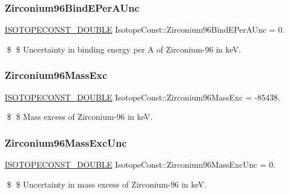 \subsubsection{\texorpdfstring{Zirconium96\+Bind\+E\+Per\+A\+Unc}{Zirconium96BindEPerAUnc}}
{\footnotesize\ttfamily \mbox{\hyperlink{group___isotope_const-_macros_ga8f45a7272ce02c0b4c65c44636ed719a}{I\+S\+O\+T\+O\+P\+E\+C\+O\+N\+S\+T\+\_\+\+D\+O\+U\+B\+LE}} Isotope\+Const\+::\+Zirconium96\+Bind\+E\+Per\+A\+Unc = 0.}

\$ \$ Uncertainty in binding energy per A of Zirconium-\/96 in keV. \mbox{\label{group___isotope_const-_zirconium-_zr96_gaeda1fe6901f94737fd801858b0702889}} 
\subsubsection{\texorpdfstring{Zirconium96\+Mass\+Exc}{Zirconium96MassExc}}
{\footnotesize\ttfamily \mbox{\hyperlink{group___isotope_const-_macros_ga8f45a7272ce02c0b4c65c44636ed719a}{I\+S\+O\+T\+O\+P\+E\+C\+O\+N\+S\+T\+\_\+\+D\+O\+U\+B\+LE}} Isotope\+Const\+::\+Zirconium96\+Mass\+Exc = -\/85438.}

\$ \$ Mass excess of Zirconium-\/96 in keV. \mbox{\label{group___isotope_const-_zirconium-_zr96_gafcbe89c7aab5ccb4ee3b8863868841be}} 
\subsubsection{\texorpdfstring{Zirconium96\+Mass\+Exc\+Unc}{Zirconium96MassExcUnc}}
{\footnotesize\ttfamily \mbox{\hyperlink{group___isotope_const-_macros_ga8f45a7272ce02c0b4c65c44636ed719a}{I\+S\+O\+T\+O\+P\+E\+C\+O\+N\+S\+T\+\_\+\+D\+O\+U\+B\+LE}} Isotope\+Const\+::\+Zirconium96\+Mass\+Exc\+Unc = 0.}

\$ \$ Uncertainty in mass excess of Zirconium-\/96 in keV. \mbox{\label{group___isotope_const-_zirconium-_zr96_ga84c1c95aedf5fccb554382f7164e16b6}} 
